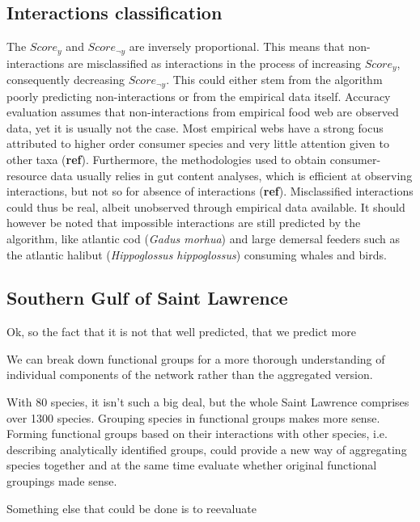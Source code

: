 \documentclass[letterpaper]{article}
\begin{document}
\subsection{Interactions classification}
The $Score_{y}$ and $Score_{\neg y}$ are inversely proportional. This means that non-interactions are misclassified as interactions in the process of increasing $Score_y$, consequently decreasing $Score_{\neg y}$. This could either stem from the algorithm poorly predicting non-interactions or from the empirical data itself. Accuracy evaluation assumes that non-interactions from empirical food web are observed data, yet it is usually not the case. Most empirical webs have a strong focus attributed to higher order consumer species and very little attention given to other taxa (\textbf{ref}). Furthermore, the methodologies used to obtain consumer-resource data usually relies in gut content analyses, which is efficient at observing interactions, but not so for absence of interactions (\textbf{ref}). Misclassified interactions could thus be real, albeit unobserved through empirical data available. It should however be noted that impossible interactions are still predicted by the algorithm, like atlantic cod (\textit{Gadus morhua}) and large demersal feeders such as the atlantic halibut (\textit{Hippoglossus hippoglossus}) consuming whales and birds.

\subsection{Southern Gulf of Saint Lawrence}



Ok, so the fact that it is not that well predicted, that we predict more

We can break down functional groups for a more thorough understanding of individual components of the network rather than the aggregated version.

With 80 species, it isn't such a big deal, but the whole Saint Lawrence comprises over 1300 species. Grouping species in functional groups makes more sense. Forming functional groups based on their interactions with other species, i.e. describing analytically identified groups, could provide a new way of aggregating species together and at the same time evaluate whether original functional groupings made sense.

Something else that could be done is to reevaluate
\end{document}
